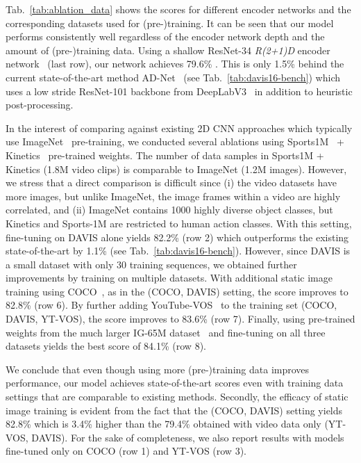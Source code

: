 \documentclass{bmvc2k}
\newcommand{\PAR}[1]{\vskip4pt \noindent {\bf #1~}}
\begin{document}
\PAR{Backbone and Training Data:}
Tab.~\ref{tab:ablation_data} shows the  scores for different encoder networks and the corresponding datasets used for (pre-)training. It can be seen that our model performs consistently well regardless of the encoder network depth and the amount of (pre-)training data.
Using a shallow ResNet-34 \textit{R(2+1)D} encoder network~\cite{Tran18CVPR} (last row), our network achieves 79.6\% . This is only 1.5\% behind the current state-of-the-art method AD-Net~\cite{Yang19ICCVAnchorDiff} (see Tab.~\ref{tab:davis16-bench}) which uses a low stride ResNet-101 backbone from DeepLabV3~\cite{Chen17ARXIV} in addition to heuristic post-processing.

In the interest of comparing against existing 2D CNN approaches which typically use ImageNet~\cite{Deng09CVPR} pre-training, we conducted several ablations using Sports1M~\cite{Karpathy14CVPR} + Kinetics~\cite{Kay17ARXIV} pre-trained weights. 
The number of data samples in Sports1M + Kinetics (1.8M video clips) is comparable to ImageNet (1.2M images). However, we stress that a direct comparison is difficult since (i) the video datasets have more images, but unlike ImageNet, the image frames within a video are highly correlated, and (ii) ImageNet contains 1000 highly diverse object classes, but Kinetics and Sports-1M are restricted to human action classes. 
With this setting, fine-tuning on DAVIS alone yields 82.2\%  (row 2) which outperforms the existing state-of-the-art by 1.1\% (see Tab.~\ref{tab:davis16-bench}). However, since DAVIS is a small dataset with only 30 training sequences, we obtained further improvements by training on multiple datasets. With additional static image training using COCO~\cite{Lin14ECCV}, as in the (COCO, DAVIS) setting, the score improves to 82.8\% (row 6). By further adding YouTube-VOS~\cite{Xu18ECCV} to the training set (COCO, DAVIS, YT-VOS), the score improves to 83.6\% (row 7). Finally, using pre-trained weights from the much larger IG-65M dataset~\cite{Ghadiyaram19CVPR} and fine-tuning on all three datasets yields the best score of 84.1\% (row 8).

We conclude that even though using more (pre-)training data improves performance, our model achieves state-of-the-art scores even with training data settings that are comparable to existing methods. Secondly, the efficacy of static image training is evident from the fact that the (COCO, DAVIS) setting yields 82.8\%  which is 3.4\% higher than the 79.4\% obtained with video data only (YT-VOS, DAVIS). For the sake of completeness, we also report results with models fine-tuned only on COCO (row 1) and YT-VOS (row 3).
\end{document}
